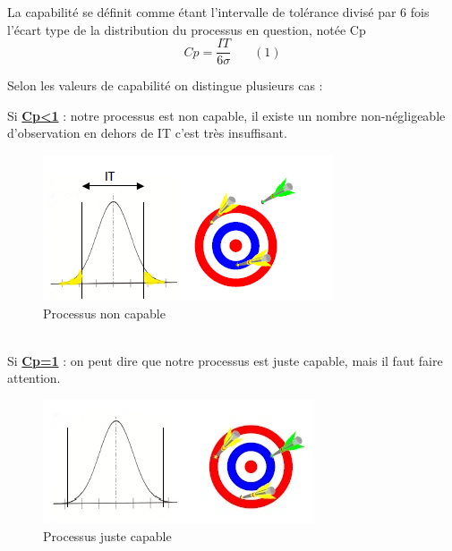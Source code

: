 \documentclass[12pt, a4paper]{thesis}
\begin{document}
La capabilité se définit comme étant l'intervalle de tolérance divisé par 6 fois l'écart type de la distribution du processus en question, notée Cp\\
\textbf{\[Cp=\frac{IT}{6\sigma } ~~~~~~~~ (1)\]}



Selon les valeurs de capabilité on distingue plusieurs cas : 

Si \textbf{\underline{Cp<1}} : notre processus est non capable, il existe un nombre non-négligeable d'observation en dehors de IT c'est très insuffisant.\\

\begin{figure}[!h]
\begin{center}
        \includegraphics[scale=1]{noncapable.png}
        
        \caption{Processus non capable}
\end{center}
\end{figure}\\

Si \textbf{\underline{Cp=1}} : on peut dire que notre processus est juste capable, mais il faut faire attention.
\begin{figure}[!h]
\begin{center}
        \includegraphics[scale=1]{justecapable.jpg}
        \caption{Processus juste capable}
\end{center}
\end{figure}\\
\end{document}

